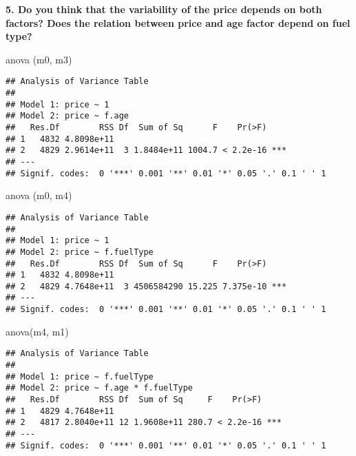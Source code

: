 \documentclass[
]{article}
\newenvironment{Shaded}{\begin{snugshade}}{\end{snugshade}}
\newcommand{\FunctionTok}[1]{\textcolor[rgb]{0.00,0.00,0.00}{#1}}
\newcommand{\NormalTok}[1]{#1}
\begin{document}
\newpage

\textbf{5. Do you think that the variability of the price depends on both factors? Does the relation between price and age factor depend on fuel type?}

\begin{Shaded}
\begin{Highlighting}[]
\FunctionTok{anova}\NormalTok{ (m0, m3)}
\end{Highlighting}
\end{Shaded}

\begin{verbatim}
## Analysis of Variance Table
## 
## Model 1: price ~ 1
## Model 2: price ~ f.age
##   Res.Df        RSS Df  Sum of Sq      F    Pr(>F)    
## 1   4832 4.8098e+11                                   
## 2   4829 2.9614e+11  3 1.8484e+11 1004.7 < 2.2e-16 ***
## ---
## Signif. codes:  0 '***' 0.001 '**' 0.01 '*' 0.05 '.' 0.1 ' ' 1
\end{verbatim}

\begin{Shaded}
\begin{Highlighting}[]
\FunctionTok{anova}\NormalTok{ (m0, m4)}
\end{Highlighting}
\end{Shaded}

\begin{verbatim}
## Analysis of Variance Table
## 
## Model 1: price ~ 1
## Model 2: price ~ f.fuelType
##   Res.Df        RSS Df  Sum of Sq      F    Pr(>F)    
## 1   4832 4.8098e+11                                   
## 2   4829 4.7648e+11  3 4506584290 15.225 7.375e-10 ***
## ---
## Signif. codes:  0 '***' 0.001 '**' 0.01 '*' 0.05 '.' 0.1 ' ' 1
\end{verbatim}

\begin{Shaded}
\begin{Highlighting}[]
\FunctionTok{anova}\NormalTok{(m4, m1)}
\end{Highlighting}
\end{Shaded}

\begin{verbatim}
## Analysis of Variance Table
## 
## Model 1: price ~ f.fuelType
## Model 2: price ~ f.age * f.fuelType
##   Res.Df        RSS Df  Sum of Sq     F    Pr(>F)    
## 1   4829 4.7648e+11                                  
## 2   4817 2.8040e+11 12 1.9608e+11 280.7 < 2.2e-16 ***
## ---
## Signif. codes:  0 '***' 0.001 '**' 0.01 '*' 0.05 '.' 0.1 ' ' 1
\end{verbatim}
\end{document}
